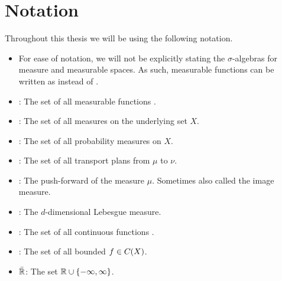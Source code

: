 \chapter*{Notation}

Throughout this thesis we will be using the following notation.

\begin{itemize}
	\item For ease of notation, we will not be explicitly stating the $\sigma$-algebras for measure and measurable spaces. As such, measurable functions can be written as  instead of .
	\item {}: The set of all measurable functions .
	\item {}: The set of all measures on the underlying set $X$.
	\item {}: The set of all probability measures on $X$.
	\item \TP{\mu}{\nu}: The set of all transport plans from $\mu$ to $\nu$.
	\item \push{\mu}: The push-forward of the measure $\mu$. Sometimes also called the image measure.
	\item \leb[d]{\cdot}: The $d$-dimensional Lebesgue measure.
	\item {}: The set of all continuous functions .
	\item {}: The set of all bounded $f \in C_{}(X)$.
	\item $\bar{\mathbb{R}}$: The set $\mathbb{R} \cup \{ -\infty, \infty \}$.
\end{itemize}